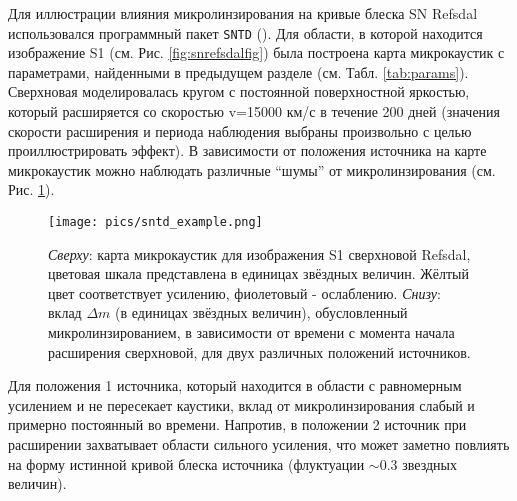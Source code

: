 Для иллюстрации влияния микролинзирования на кривые блеска SN Refsdal использовался программный пакет {\tt{SNTD}} (\cite{pierelrodney2019}). Для области, в которой находится изображение S1 (см. Рис. \ref{fig:snrefsdalfig}) была построена карта микрокаустик с параметрами, найденными в предыдущем разделе (см. Табл. \ref{tab:params}). Сверхновая моделировалась кругом с постоянной поверхностной яркостью, который расширяется со скоростью v=15000 км/с в течение 200 дней (значения скорости расширения и периода наблюдения выбраны  произвольно с целью проиллюстрировать эффект). В зависимости от положения источника на карте микрокаустик можно наблюдать различные “шумы” от микролинзирования (см. Рис. \ref{fig:sntd_example}).

\begin{figure}[H]
    \centering
	\texttt{[image: pics/sntd\_example.png]}
	\caption{\textit{Сверху}: карта микрокаустик для изображения S1 сверхновой Refsdal, цветовая шкала представлена в единицах звёздных величин. Жёлтый цвет соответствует усилению, фиолетовый - ослаблению. \textit{Снизу}: вклад $\Delta m$ (в единицах звёздных величин), обусловленный микролинзированием, в зависимости от времени с момента начала расширения сверхновой, для двух различных положений источников. \label{fig:sntd_example}} 
\end{figure}

Для положения 1 источника, который находится в области с равномерным усилением и не пересекает каустики, вклад от микролинзирования слабый и примерно постоянный во времени. Напротив, в положении 2 источник при расширении захватывает области сильного усиления, что может заметно повлиять на форму истинной кривой блеска источника (флуктуации $\sim 0.3$ звездных величин). 